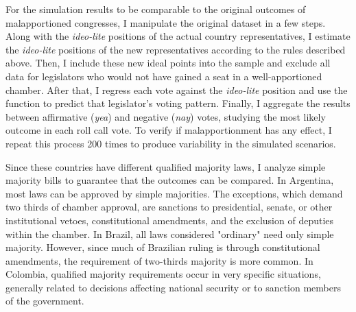 \documentclass[a4paper,12pt]{article}
\begin{document}

For the simulation results to be comparable to the original outcomes of malapportioned congresses, I manipulate the original dataset in a few steps. Along with the \textit{ideo-lite} positions of the actual country representatives, I estimate the \textit{ideo-lite} positions of the new representatives according to the rules described above. Then, I include these new ideal points into the sample and exclude all data for legislators who would not have gained a seat in a well-apportioned chamber. %
After that, I regress each vote against the \textit{ideo-lite} position and use the function to predict that legislator's voting pattern. Finally, I aggregate the results between affirmative (\textit{yea}) and negative (\textit{nay}) votes, studying the most likely outcome in each roll call vote. To verify if malapportionment has any effect, I repeat this process 200 times to produce variability in the simulated scenarios. 

Since these countries have different qualified majority laws, I analyze simple majority bills to guarantee that the outcomes can be compared. In Argentina, most laws can be approved by simple majorities. The exceptions, which demand two thirds of chamber approval, are sanctions to presidential, senate, or other institutional vetoes, constitutional amendments, and the exclusion of deputies within the chamber. In Brazil, all laws considered "ordinary" need only simple majority. However, since much of Brazilian ruling is through constitutional amendments, the requirement of two-thirds majority is more common. In Colombia, qualified majority requirements occur in very specific situations, generally related to decisions affecting national security or to sanction members of the government.
\end{document}
